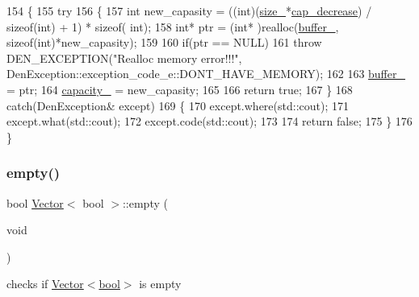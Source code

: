 \begin{DoxyCode}
154     \{
155         \textcolor{keywordflow}{try}
156             \{
157                 \textcolor{keywordtype}{int} new\_capasity = ((int)(\hyperlink{classVector_3_01bool_01_4_a07895adb41b2c819f85640e35c0d4ae0}{size\_}*\hyperlink{classVector_3_01bool_01_4_af050d33b0ff1d75bdf15909388fcf897}{cap\_decrease}) / \textcolor{keyword}{sizeof}(int) + 1) * \textcolor{keyword}{sizeof}(
      int);
158                 \textcolor{keywordtype}{int}* ptr = (\textcolor{keywordtype}{int}* )realloc(\hyperlink{classVector_3_01bool_01_4_ae2183c11de877eb13209c6a5a593604f}{buffer\_}, \textcolor{keyword}{sizeof}(\textcolor{keywordtype}{int})*new\_capasity);
159 
160                 \textcolor{keywordflow}{if}(ptr == NULL)
161                     \textcolor{keywordflow}{throw} DEN\_EXCEPTION(\textcolor{stringliteral}{"Realloc memory error!!!"}, 
      DenException::exception\_code\_e::DONT\_HAVE\_MEMORY);
162 
163                 \hyperlink{classVector_3_01bool_01_4_ae2183c11de877eb13209c6a5a593604f}{buffer\_} = ptr;
164                 \hyperlink{classVector_3_01bool_01_4_ac3da0e4580bca55cab445ed3f9c50f2d}{capacity\_} = new\_capasity;
165 
166                 \textcolor{keywordflow}{return} \textcolor{keyword}{true};
167             \}
168         \textcolor{keywordflow}{catch}(DenException& except)
169             \{
170                 except.where(std::cout);
171                 except.what(std::cout);
172                 except.code(std::cout);
173 
174                 \textcolor{keywordflow}{return} \textcolor{keyword}{false};
175             \}
176     \}
\end{DoxyCode}
\mbox{\label{classVector_3_01bool_01_4_a830fa9ddb2e3b9b000ecd6a15f51f6c2}} 
\subsubsection{\texorpdfstring{empty()}{empty()}}
{\footnotesize\ttfamily bool \hyperlink{classVector}{Vector}$<$ bool $>$\+::empty (\begin{DoxyParamCaption}\item[{void}]{ }\end{DoxyParamCaption})}



checks if \hyperlink{classVector_3_01bool_01_4}{Vector$<$bool$>$} is empty 

